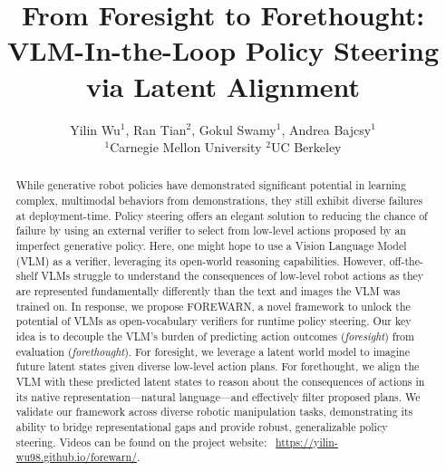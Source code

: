 \documentclass[conference]{IEEEtran}
\begin{document}
\title{From Foresight to Forethought: VLM-In-the-Loop Policy Steering via Latent Alignment}

\author{Yilin Wu$^{1}$, Ran Tian$^{2}$, Gokul Swamy$^{1}$, Andrea Bajcsy$^{1}$\\
$^{1}$Carnegie Mellon University $^{2}$UC Berkeley

}





\makeatletter
\let\@oldmaketitle\@maketitle%
\renewcommand{\@maketitle}{\@oldmaketitle%
\setcounter{figure}{0} %
\centering
\texttt{[image: figs/framework\_figure.pdf]}
\captionof{figure}{We present \textbf{FOREWARN}, an VLM-in-the-loop policy steering algorithm for multi-modal generative robot policies. 
Our key idea is to decouple the VLM's burden of predicting action outcomes from evaluation. 
By predicting action outcomes with a pre-trained latent dynamics model and aligning a VLM to reason about these latent states in text, FOREWARN can select action plans at runtime that are most appropriate for new task contexts and user needs. 
}
\label{fig:front-fig}
\vspace{-0.3in}
\bigskip}
\makeatother
\maketitle



\begin{abstract}
While generative robot policies have demonstrated significant potential in learning complex, multimodal behaviors from demonstrations, they still exhibit diverse failures at deployment-time. 
Policy steering offers an elegant solution to reducing the chance of failure by using an external verifier to select from low-level actions proposed by an imperfect generative policy. 
Here, one might hope to use a Vision Language Model (VLM) as a verifier, leveraging its open-world reasoning capabilities. 
However, off-the-shelf VLMs struggle to understand the consequences of low-level robot actions as they are represented fundamentally differently than the text and images the VLM was trained on. 
In response, we propose FOREWARN,
a novel framework to unlock the potential of VLMs 
as open-vocabulary verifiers for runtime policy steering. 
Our key idea is to decouple the VLM's burden of predicting action outcomes (\textit{foresight}) from evaluation (\textit{forethought}). 
For foresight, we leverage a latent world model to imagine future latent states given diverse low-level action plans. 
For forethought, we align the VLM with these predicted latent states to 
reason about the consequences of actions in its native representation---natural language---and effectively filter proposed plans. 
We validate our framework across diverse robotic manipulation tasks, demonstrating its ability to bridge representational gaps and provide robust, generalizable policy steering. Videos can be found on the project website: ~\href{https://yilin-wu98.github.io/forewarn/}{https://yilin-wu98.github.io/forewarn/}.
\end{abstract}
\end{document}
